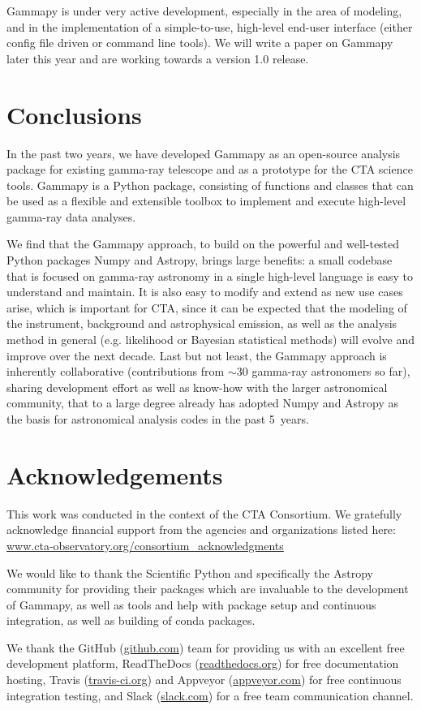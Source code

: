 \documentclass{PoS}
\newcommand{\urlCtaAck}{\href{http://www.cta-observatory.org/consortium_acknowledgments}{www.cta-observatory.org/consortium\_acknowledgments}}
\newcommand{\urlGithub}{\href{https://github.com}{github.com}}
\newcommand{\urlRtd}{\href{https://readthedocs.org}{readthedocs.org}}
\newcommand{\urlTravis}{\href{https://travis-ci.org}{travis-ci.org}}
\newcommand{\urlAppveyor}{\href{https://appveyor.com}{appveyor.com}}
\newcommand{\urlSlack}{\href{https://slack.com}{slack.com}}
\begin{document}
Gammapy is under very active development, especially in the area of modeling,
and in the implementation of a simple-to-use, high-level end-user interface
(either config file driven or command line tools). We will write a paper on
Gammapy later this year and are working towards a version 1.0 release.

\section{Conclusions}
\label{sec:conclusions}

In the past two years, we have developed Gammapy as an open-source analysis
package for existing gamma-ray telescope and as a prototype for the CTA science
tools. Gammapy is a Python package, consisting of functions and classes that can
be used as a flexible and extensible toolbox to implement and execute high-level
gamma-ray data analyses.

We find that the Gammapy approach, to build on the powerful and well-tested
Python packages Numpy and Astropy, brings large benefits: a small codebase that
is focused on gamma-ray astronomy in a single high-level language is easy to
understand and maintain. It is also easy to modify and extend as new use cases
arise, which is important for CTA, since it can be expected that the modeling of
the instrument, background and astrophysical emission, as well as the analysis
method in general (e.g. likelihood or Bayesian statistical methods) will evolve
and improve over the next decade. Last but not least, the Gammapy approach is
inherently collaborative (contributions from $\sim$30 gamma-ray astronomers so
far), sharing development effort as well as know-how with the larger
astronomical community, that to a large degree already has adopted Numpy and
Astropy as the basis for astronomical analysis codes in the past 5~years.

\section{Acknowledgements} \label{sed:acknowledgements}

This work was conducted in the context of the CTA Consortium. We gratefully
acknowledge financial support from the agencies and organizations listed here:\\
\urlCtaAck

We would like to thank the Scientific Python and specifically the Astropy
community for providing their packages which are invaluable to the development
of Gammapy, as well as tools and help with package setup and continuous
integration, as well as building of conda packages.

We thank the GitHub (\urlGithub) team for providing us with an excellent free
development platform, ReadTheDocs (\urlRtd) for free documentation hosting,
Travis (\urlTravis) and Appveyor (\urlAppveyor) for free continuous integration
testing, and Slack (\urlSlack) for a free team communication channel.



\end{document}
